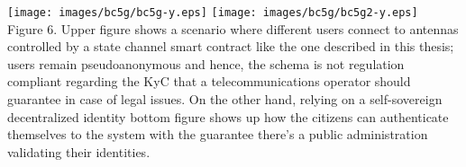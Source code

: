 \documentclass[12pt]{amsart}
\begin{document}
\begin{center}
  \texttt{[image: images/bc5g/bc5g-y.eps]}
  \texttt{[image: images/bc5g/bc5g2-y.eps]}
\\
Figure 6. Upper figure shows a scenario where different users connect
to antennas controlled by a state channel smart contract like the one
described in this thesis; users remain pseudoanonymous and hence, the
schema is not regulation compliant regarding the KyC that a
telecommunications
operator should guarantee in case of legal issues. On the other hand,
relying on a self-sovereign decentralized identity bottom figure shows
up how the citizens can authenticate themselves to the system with the
guarantee there's a public administration validating their identities.
\\
\end{center}
\end{document}

